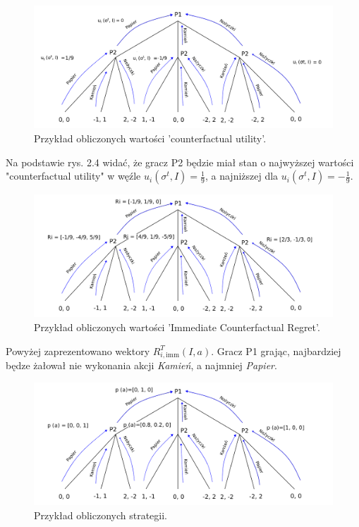 \documentclass[12pt,oneside,a4paper]{report}
\begin{document}
\begin{figure}[th!]
            \center
           \includegraphics[width=1\textwidth]{./img/drawing2.pdf}
           \caption{Przykład obliczonych wartości 'counterfactual utility'.}
\end{figure}

Na podstawie rys. 2.4 widać, że gracz P2 będzie miał stan o najwyższej wartości "counterfactual utility" w węźle $u_{i}
(\sigma^{t}, I)=\frac{1}{9}$, a najniższej dla $u_{i}(\sigma^{t}, I)=-\frac{1}{9}$.


\begin{figure}[th!]
            \center
           \includegraphics[width=1\textwidth]{./img/drawing3.pdf}
           \caption{Przykład obliczonych wartości 'Immediate Counterfactual Regret'.}
\end{figure}

\vspace{0.5cm}
\vspace{10cm}

Powyżej zaprezentowano wektory $R^{T}_{i,\text{imm}} (I, a)$.
Gracz P1 grając, najbardziej będze żałował nie wykonania akcji \emph{Kamień}, a najmniej
\emph{Papier}.

\vspace{0.5cm}
\begin{figure}[th!]
            \center
           \includegraphics[width=1\textwidth]{./img/drawing4.pdf}
           \caption{Przykład obliczonych strategii.}
\end{figure}
 
\end{document}
